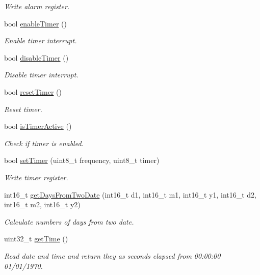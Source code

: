 \begin{DoxyCompactItemize}
\begin{DoxyCompactList}\small\item\em Write alarm register. \end{DoxyCompactList}\item 
bool \hyperlink{namespacePcf8563_af4cc94d1ea73bbff5d44e1b716111cdb}{enable\+Timer} ()
\begin{DoxyCompactList}\small\item\em Enable timer interrupt. \end{DoxyCompactList}\item 
bool \hyperlink{namespacePcf8563_ac2c3ca7f3a13516c6549bfc0f6527c6a}{disable\+Timer} ()
\begin{DoxyCompactList}\small\item\em Disable timer interrupt. \end{DoxyCompactList}\item 
bool \hyperlink{namespacePcf8563_a6fd0509d12fd312b5dbed8506b9315c9}{reset\+Timer} ()
\begin{DoxyCompactList}\small\item\em Reset timer. \end{DoxyCompactList}\item 
bool \hyperlink{namespacePcf8563_aab079fef811171abcba7e80b8595a8d1}{is\+Timer\+Active} ()
\begin{DoxyCompactList}\small\item\em Check if timer is enabled. \end{DoxyCompactList}\item 
bool \hyperlink{namespacePcf8563_a338898a456015e796d48b82738d5a8c4}{set\+Timer} (uint8\+\_\+t frequency, uint8\+\_\+t timer)
\begin{DoxyCompactList}\small\item\em Write timer register. \end{DoxyCompactList}\item 
int16\+\_\+t \hyperlink{namespacePcf8563_a7ffd9819a4946feda4117a90ef176ab9}{get\+Days\+From\+Two\+Date} (int16\+\_\+t d1, int16\+\_\+t m1, int16\+\_\+t y1, int16\+\_\+t d2, int16\+\_\+t m2, int16\+\_\+t y2)
\begin{DoxyCompactList}\small\item\em Calculate numbers of days from two date. \end{DoxyCompactList}\item 
uint32\+\_\+t \hyperlink{namespacePcf8563_a2824a08aaed53b49a8fc1aa77cab629d}{get\+Time} ()
\begin{DoxyCompactList}\small\item\em Read date and time and return they as seconds elapsed from 00\+:00\+:00 01/01/1970. \end{DoxyCompactList}\end{DoxyCompactItemize}



